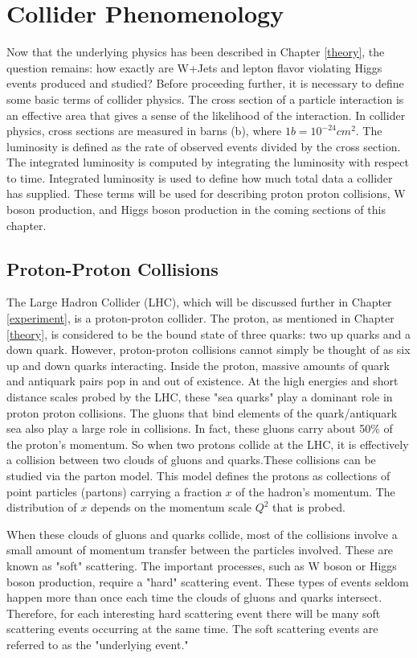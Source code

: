 \documentclass[oneside, letterpaper, oldfontcommands]{memoir}
\begin{document}
\chapter{Collider Phenomenology}\label{pheno}
Now that the underlying physics has been described in Chapter \ref{theory}, the question remains: how exactly are W+Jets and lepton flavor violating Higgs events produced and studied? Before proceeding further, it is necessary to define some basic terms of collider physics. The cross section of a particle interaction is an effective area that gives a sense of the likelihood of the interaction. In collider physics, cross sections are measured in barns (b), where $1b = 10^{-24}cm^{2}$. The luminosity is defined as the rate of observed events divided by the cross section. The integrated luminosity is computed by integrating the luminosity with respect to time. Integrated luminosity is used to define how much total data a collider has supplied. These terms will be used for describing proton proton collisions, W boson production, and Higgs boson production in the coming sections of this chapter.

\section{Proton-Proton Collisions}\label{ppcoll}
\qquad The Large Hadron Collider (LHC), which will be discussed further in Chapter \ref{experiment}, is a proton-proton collider. The proton, as mentioned in Chapter \ref{theory}, is considered to be the bound state of three quarks: two up quarks and a down quark. However, proton-proton collisions cannot simply be thought of as six up and down quarks interacting. Inside the proton, massive amounts of quark and antiquark pairs pop in and out of existence. At the high energies and short distance scales probed by the LHC, these "sea quarks" play a dominant role in proton proton collisions. The gluons that bind elements of the quark/antiquark sea also play a large role in collisions. In fact, these gluons carry about 50$\%$ of the proton's momentum\cite{Halzen:1984mc}. So when two protons collide at the LHC, it is effectively a collision between two clouds of gluons and quarks.These collisions can be studied via the parton model. This model defines the protons as collections of point particles (partons) carrying a fraction $x$ of the hadron's momentum. The distribution of $x$ depends on the momentum scale $Q^{2}$ that is probed. 

\qquad When these clouds of gluons and quarks collide, most of the collisions involve a small amount of momentum transfer between the particles involved. These are known as "soft" scattering. The important processes, such as W boson or Higgs boson production, require a "hard" scattering event. These types of events seldom happen more than once each time the clouds of gluons and quarks intersect. Therefore, for each interesting hard scattering event there will be many soft scattering events occurring at the same time. The soft scattering events are referred to as the "underlying event."
\end{document}
